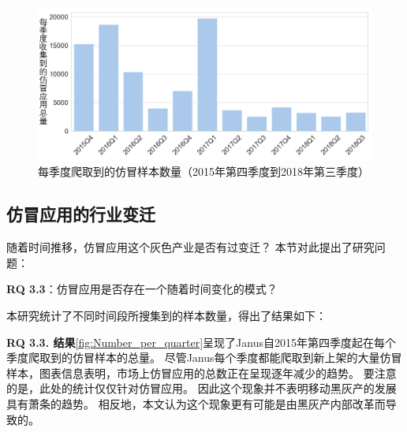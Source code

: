 \begin{figure}[htbp]
	\centering
	\includegraphics[width=\textwidth]{./Figures/edwin-Number_of_samples_collected_per_quarter_3.png}
	\caption{每季度爬取到的仿冒样本数量（2015年第四季度到2018年第三季度）}
	\label{fig:Number_per_quarter}
\end{figure}

\subsection{仿冒应用的行业变迁}
随着时间推移，仿冒应用这个灰色产业是否有过变迁？
本节对此提出了研究问题：

{\bf RQ 3.3}：仿冒应用是否存在一个随着时间变化的模式？

本研究统计了不同时间段所搜集到的样本数量，得出了结果如下：

{\bf RQ 3.3. 结果}\autoref{fig:Number_per_quarter}呈现了Janus自2015年第四季度起在每个季度爬取到的仿冒样本的总量。
尽管Janus每个季度都能爬取到新上架的大量仿冒样本，图表信息表明，市场上仿冒应用的总数正在呈现逐年减少的趋势。
要注意的是，此处的统计仅仅针对仿冒应用。
因此这个现象并不表明移动黑灰产的发展具有萧条的趋势。
相反地，本文认为这个现象更有可能是由黑灰产内部改革而导致的。

